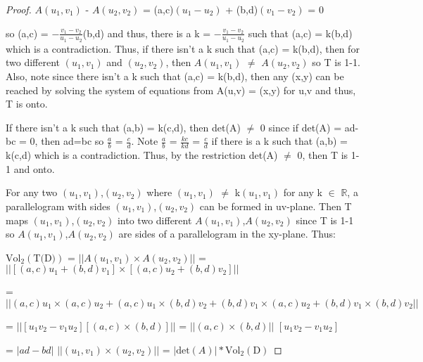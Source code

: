 \begin{proof}
        \hspace{0.5cm}
        $A(u_1,v_1)$ - $A(u_2,v_2)$ =
        (a,c)$(u_1-u_2)$ + (b,d)$(v_1-v_2)$ = 0

        so (a,c) = $-\frac{v_1 - v_2}{u_1 - u_2}$(b,d)
        and thus, there is a k = $-\frac{v_1 - v_2}{u_1 - u_2}$
        such that (a,c) = k(b,d) which is a contradiction.
        Thus, if there isn't a k such that (a,c) = k(b,d), then
        for two different $(u_1,v_1)$ and $(u_2,v_2)$, then 
        $A(u_1,v_1)$ $\not =$ $A(u_2,v_2)$ so T is 1-1.
        Also, note since there isn't a k such that (a,c) = k(b,d),
        then any (x,y) can be reached by solving the system of
        equations from A(u,v) = (x,y) for u,v and thus, T is onto.
        
        If there isn't a k such that (a,b) = k(c,d), then det(A) $\not =$ 0
        since if det(A) = ad-bc = 0, then ad=bc so $\frac{a}{b}$ = $\frac{c}{d}$.
        Note $\frac{a}{b}$ = $\frac{kc}{kd}$ = $\frac{c}{d}$ if there is a k
        such that (a,b) = k(c,d) which is a contradiction.
        Thus, by the restriction det(A) $\not =$ 0, then T is 1-1 and onto.

        \vspace{0.3cm}

        For any two $(u_1,v_1)$,$(u_2,v_2)$ where $(u_1,v_1)$ $\not  =$ k$(u_1,v_1)$
        for any k $\in$ $\mathbb{R}$, a parallelogram
        with sides $(u_1,v_1)$,$(u_2,v_2)$ can be formed in uv-plane.
        Then T maps $(u_1,v_1)$,$(u_2,v_2)$ into two different
        $A(u_1,v_1)$,$A(u_2,v_2)$ since T is 1-1 so $A(u_1,v_1)$,$A(u_2,v_2)$
        are sides of a parallelogram in the xy-plane. Thus:

        \hspace{0.5cm}
        $\text{Vol}_2(\text{T(D)})$
        = $|| A(u_1,v_1) \times A(u_2,v_2) ||$
        = $|| [(a,c)u_1 + (b,d)v_1] \times [(a,c)u_2 + (b,d)v_2] ||$
        
        \hspace{0.5cm}
        = $|| (a,c)u_1 \times (a,c)u_2
                + (a,c)u_1 \times (b,d)v_2
                + (b,d)v_1 \times (a,c)u_2
                + (b,d)v_1 \times (b,d)v_2 ||$

        \hspace{0.5cm}
        = $|| [u_1v_2 - v_1u_2] [(a,c) \times (b,d)] ||$
        = $|| (a,c) \times (b,d) ||$ $[u_1v_2 - v_1u_2]$

        \hspace{0.5cm}
        = $|ad-bd|$ $|| (u_1,v_1) \times (u_2,v_2) ||$
        = $|\text{det}(A)| * \text{Vol}_2(\text{D})$
    \end{proof}

